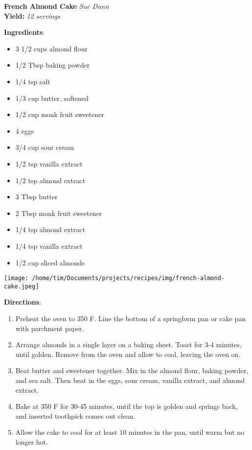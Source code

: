 \documentclass[11pt, twoside, openany]{book}
\begin{document}
\noindent\begin{minipage}[t]{\linewidth}%
{\Large\textbf{French Almond Cake}} \label{french-almond-cake}\hfill\textit{Sue Dunn}\\
\textbf{Yield:} \textit{12 servings}\\
\noindent\begin{minipage}[t]{0.78\linewidth}%
\textbf{Ingredients}:\vspace{-3mm}
\begin{multicols}{2}
\begin{itemize}\setlength\itemsep{-1mm}
\item 3 1/2 cups almond flour
\item 1/2 Tbsp baking powder
\item 1/4 tsp salt
\item 1/3 cup butter, softened
\item 1/2 cup monk fruit sweetener
\item 4 eggs
\item 3/4 cup sour cream
\item 1/2 tsp vanilla extract
\item 1/2 tsp almond extract
\item 3 Tbsp butter
\item 2 Tbsp monk fruit sweetener
\item 1/4 tsp almond extract
\item 1/4 tsp vanilla extract
\item 1/2 cup sliced almonds
\end{itemize}
\end{multicols}
\end{minipage}
\noindent\begin{minipage}[t]{0.18\linewidth}
\centering \strut\vspace*{-\baselineskip}\newline
\texttt{[image: /home/tim/Documents/projects/recipes/img/french-almond-cake.jpeg]}\\
\end{minipage}\vspace{3mm}
\textbf{Directions}:
\vspace{-3mm}\begin{enumerate}\setlength\itemsep{-1mm}
\item Preheat the oven to 350 F. Line the bottom of a springform pan or cake pan with parchment paper.
\item Arrange almonds in a single layer on a baking sheet. Toast for 3-4 minutes, until golden. Remove from the oven and allow to cool, leaving the oven on.
\item Beat butter and sweetener together. Mix in the almond flour, baking powder, and sea salt. Then beat in the eggs, sour cream, vanilla extract, and almond extract.
\item Bake at 350 F for 30-45 minutes, until the top is golden and springs back, and inserted toothpick comes out clean.
\item Allow the cake to cool for at least 10 minutes in the pan, until warm but no longer hot.
\end{enumerate}
\end{minipage}\vspace{8mm}
\end{document}
